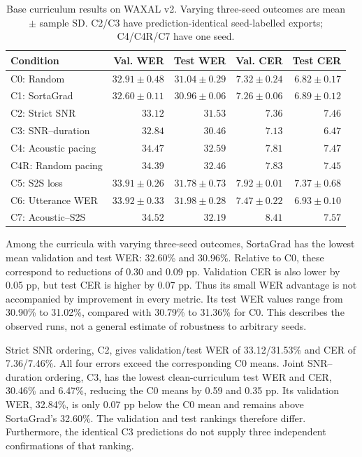 \documentclass[12pt,a4paper]{report}
\begin{document}
\begin{table}[htbp]\centering\scriptsize
\caption{Base curriculum results on WAXAL v2. Varying three-seed outcomes are mean $\pm$ sample SD. C2/C3 have prediction-identical seed-labelled exports; C4/C4R/C7 have one seed.}\label{tab:results-rq1}
\setlength{\tabcolsep}{4pt}
\begin{tabular}{lrrrr}\toprule
Condition & Val. WER & Test WER & Val. CER & Test CER\\\midrule
C0: Random & $32.91 \pm 0.48$ & $31.04 \pm 0.29$ & $7.32 \pm 0.24$ & $6.82 \pm 0.17$ \\
C1: SortaGrad & $32.60 \pm 0.11$ & $30.96 \pm 0.06$ & $7.26 \pm 0.06$ & $6.89 \pm 0.12$ \\
C2: Strict SNR & $33.12$ & $31.53$ & $7.36$ & $7.46$ \\
C3: SNR--duration & $32.84$ & $30.46$ & $7.13$ & $6.47$ \\
C4: Acoustic pacing & $34.47$ & $32.59$ & $7.81$ & $7.47$ \\
C4R: Random pacing & $34.39$ & $32.46$ & $7.83$ & $7.45$ \\
C5: S2S loss & $33.91 \pm 0.26$ & $31.78 \pm 0.73$ & $7.92 \pm 0.01$ & $7.37 \pm 0.68$ \\
C6: Utterance WER & $33.92 \pm 0.33$ & $31.98 \pm 0.28$ & $7.47 \pm 0.22$ & $6.93 \pm 0.10$ \\
C7: Acoustic--S2S & $34.52$ & $32.19$ & $8.41$ & $7.57$ \\
\bottomrule\end{tabular}\end{table}

Among the curricula with varying three-seed outcomes, SortaGrad has the lowest mean validation and test WER: 32.60\% and 30.96\%. Relative to C0, these correspond to reductions of 0.30 and 0.09 pp. Validation CER is also lower by 0.05 pp, but test CER is higher by 0.07 pp. Thus its small WER advantage is not accompanied by improvement in every metric. Its test WER values range from 30.90\% to 31.02\%, compared with 30.79\% to 31.36\% for C0. This describes the observed runs, not a general estimate of robustness to arbitrary seeds.

Strict SNR ordering, C2, gives validation/test WER of 33.12/31.53\% and CER of 7.36/7.46\%. All four errors exceed the corresponding C0 means. Joint SNR--duration ordering, C3, has the lowest clean-curriculum test WER and CER, 30.46\% and 6.47\%, reducing the C0 means by 0.59 and 0.35 pp. Its validation WER, 32.84\%, is only 0.07 pp below the C0 mean and remains above SortaGrad's 32.60\%. The validation and test rankings therefore differ. Furthermore, the identical C3 predictions do not supply three independent confirmations of that ranking.
\end{document}
